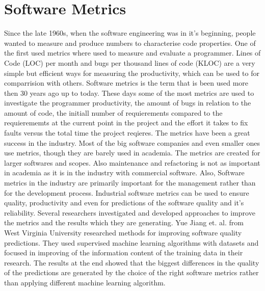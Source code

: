 \section{Software Metrics}
Since the late 1960s, when the software engineering was in it’s beginning, people wanted to measure and produce numbers to characterise code properties. 
One of the first used metrics where used to measure and evaluate a programmer. Lines of Code (LOC) per month and bugs per thousand lines of code (KLOC) are a very simple but efficient ways for measuring the productivity, which can be used to for comparrision with others.
Software metrics is the term that is been used more then 30 years ago up to today. 
These days some of the most metrics are used to investigate the programmer productivity, the amount of bugs in relation to the amount of code, the initiall number of requierements compared to the requierememts at the current point in the project and the effort it takes to fix faults versus the total time the project reqieres. \cite{kaner2004software}
The metrics have been a great success in the industry. Most of the big software companies and even smaller ones use metrics, though they are barely used in academia. 
The metrics are created for larger softwares and scopes. Also maintenance and refactoring is not as important in academia as it is in the industry with commercial software. Also, Software metrics in the industry are primarily important for the management rather than for the development process. 
Industrial software metrics can be used to ensure quality, productivity and even for predictions of the software quality and it’s reliability. 
\cite{fenton1999software}
Several researchers investigated and developed approaches to improve the metrics and the results which they are generating. 
Yue Jiang et. al. from West Virginia University researched methods for improving software quality predictions. They used supervised machine learning algorithms with datasets and focused in improving of the information content of the training data in their research. The results at the end showed that the biggest differences in the quality of the predictions are generated by the choice of the right software metrics rather than applying different machine learning algorithm. 
\cite{jiang2008comparing} 


